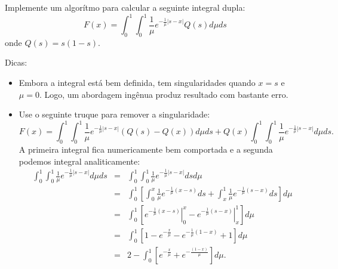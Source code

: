 \begin{exer}\label{exerc:transp_int}
Implemente um algorítmo para calcular a seguinte integral dupla:
$$
F(x)=\int_0^1\int_0^1\frac{1}{\mu}e^{-\frac{1}{\mu} |s-x|}Q(s)d\mu ds
$$
onde $Q(s)=s(1-s)$.

Dicas:
\begin{itemize}
 \item Embora a integral está bem definida, tem singularidades quando $x=s$ e $\mu=0$. Logo, um abordagem ingênua produz resultado com bastante erro.
 \item Use o seguinte truque para remover a singularidade:
 $$
F(x)=\int_0^1\int_0^1\frac{1}{\mu}e^{-\frac{1}{\mu} |s-x|}(Q(s)-Q(x))d\mu ds+Q(x)\int_0^1\int_0^1\frac{1}{\mu}e^{-\frac{1}{\mu} |s-x|}d\mu ds.
$$
\subitem A primeira integral fica numericamente bem comportada e a segunda podemos integral analiticamente:
\begin{eqnarray*}
 \int_0^1\int_0^1\frac{1}{\mu}e^{-\frac{1}{\mu} |s-x|}d\mu ds&=&\int_0^1\int_0^1\frac{1}{\mu}e^{-\frac{1}{\mu} |s-x|}ds d\mu\\
 &=&\int_0^1\left[\int_0^x\frac{1}{\mu}e^{-\frac{1}{\mu} (x-s)}ds+\int_x^1\frac{1}{\mu}e^{-\frac{1}{\mu} (s-x)}ds \right]d\mu\\ 
&=&\int_0^1\left[\left. e^{-\frac{1}{\mu} (x-s)}\right|_0^x-\left.e^{-\frac{1}{\mu} (s-x)}\right|_x^1 \right]d\mu\\ 
&=&\int_0^1\left[ 1-e^{-\frac{x}{\mu} }-e^{-\frac{1}{\mu} (1-x)}+1 \right]d\mu\\
&=&2-\int_0^1\left[ e^{-\frac{x}{\mu} }+e^{-\frac{(1-x)}{\mu} } \right]d\mu.
\end{eqnarray*}
\end{itemize}


\end{exer}